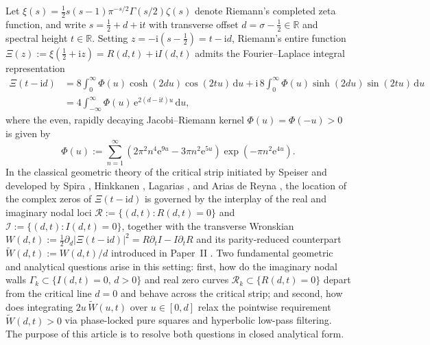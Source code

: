 \documentclass[11pt,a4paper,reqno]{amsart}
\theoremstyle{definition}
\theoremstyle{remark}
\numberwithin{equation}{section}
\newcommand{\dd}{\mathrm{d}}
\newcommand{\ii}{\mathrm{i}}
\newcommand{\ee}{\mathrm{e}}
\newcommand{\Wtil}{\widetilde{W}}
\begin{document}
Let $\xi(s) = \frac{1}{2}s(s-1)\pi^{-s/2}\Gamma(s/2)\zeta(s)$ denote Riemann's completed zeta function, and write $s = \frac{1}{2} + d + \ii t$ with transverse offset $d = \sigma - \frac{1}{2} \in \mathbb{R}$ and spectral height $t \in \mathbb{R}$. Setting $z = -\ii(s - \frac{1}{2}) = t - \ii d$, Riemann's entire function $\Xi(z) := \xi(\frac{1}{2} + \ii z) = R(d,t) + \ii I(d,t)$ admits the Fourier--Laplace integral representation \cite{Riemann1859,Polya1926,Titchmarsh1986}
\begin{equation}\label{eq:Xi_integral}
\begin{aligned}
\Xi(t - \ii d) &= 8\int_0^\infty \Phi(u)\cosh(2d u)\cos(2t u)\,\dd u + \ii\,8\int_0^\infty \Phi(u)\sinh(2d u)\sin(2t u)\,\dd u \\
&= 4\int_{-\infty}^\infty \Phi(u)\,\ee^{2(d - \ii t)u}\,\dd u,
\end{aligned}
\end{equation}
where the even, rapidly decaying Jacobi--Riemann kernel $\Phi(u) = \Phi(-u) > 0$ is given by
\begin{equation}\label{eq:Phi_def}
\Phi(u) := \sum_{n=1}^\infty \left(2\pi^2 n^4 \ee^{9u} - 3\pi n^2 \ee^{5u}\right)\exp\!\left(-\pi n^2 \ee^{4u}\right).
\end{equation}
In the classical geometric theory of the critical strip initiated by Speiser \cite{Speiser1934} and developed by Spira \cite{Spira1968,Spira1973}, Hinkkanen \cite{Hinkkanen1997}, Lagarias \cite{Lagarias1999}, and Arias de Reyna \cite{AriasDeReyna2003}, the location of the complex zeros of $\Xi(t-\ii d)$ is governed by the interplay of the real and imaginary nodal loci $\mathcal{R} := \{(d,t) : R(d,t) = 0\}$ and $\mathcal{I} := \{(d,t) : I(d,t) = 0\}$, together with the transverse Wronskian $W(d,t) := \frac{1}{2}\partial_d|\Xi(t-\ii d)|^2 = R\partial_t I - I\partial_t R$ and its parity-reduced counterpart $\Wtil(d,t) := W(d,t)/d$ introduced in Paper~II \cite{Missiaen2026Paper2}. Two fundamental geometric and analytical questions arise in this setting: first, how do the imaginary nodal walls $\Gamma_k \subset \{I(d,t) = 0,\, d > 0\}$ and real zero curves $\mathcal{R}_k \subset \{R(d,t) = 0\}$ depart from the critical line $d = 0$ and behave across the critical strip; and second, how does integrating $2u\,\Wtil(u,t)$ over $u \in [0,d]$ relax the pointwise requirement $\Wtil(d,t) > 0$ via phase-locked pure squares and hyperbolic low-pass filtering. The purpose of this article is to resolve both questions in closed analytical form.
\end{document}
